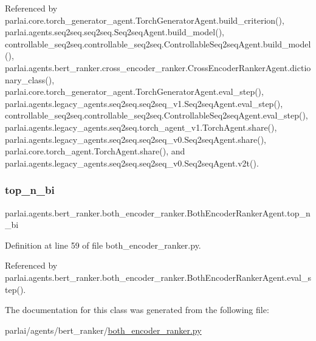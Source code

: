 Referenced by parlai.\+core.\+torch\+\_\+generator\+\_\+agent.\+Torch\+Generator\+Agent.\+build\+\_\+criterion(), parlai.\+agents.\+seq2seq.\+seq2seq.\+Seq2seq\+Agent.\+build\+\_\+model(), controllable\+\_\+seq2seq.\+controllable\+\_\+seq2seq.\+Controllable\+Seq2seq\+Agent.\+build\+\_\+model(), parlai.\+agents.\+bert\+\_\+ranker.\+cross\+\_\+encoder\+\_\+ranker.\+Cross\+Encoder\+Ranker\+Agent.\+dictionary\+\_\+class(), parlai.\+core.\+torch\+\_\+generator\+\_\+agent.\+Torch\+Generator\+Agent.\+eval\+\_\+step(), parlai.\+agents.\+legacy\+\_\+agents.\+seq2seq.\+seq2seq\+\_\+v1.\+Seq2seq\+Agent.\+eval\+\_\+step(), controllable\+\_\+seq2seq.\+controllable\+\_\+seq2seq.\+Controllable\+Seq2seq\+Agent.\+eval\+\_\+step(), parlai.\+agents.\+legacy\+\_\+agents.\+seq2seq.\+torch\+\_\+agent\+\_\+v1.\+Torch\+Agent.\+share(), parlai.\+agents.\+legacy\+\_\+agents.\+seq2seq.\+seq2seq\+\_\+v0.\+Seq2seq\+Agent.\+share(), parlai.\+core.\+torch\+\_\+agent.\+Torch\+Agent.\+share(), and parlai.\+agents.\+legacy\+\_\+agents.\+seq2seq.\+seq2seq\+\_\+v0.\+Seq2seq\+Agent.\+v2t().

\mbox{\label{classparlai_1_1agents_1_1bert__ranker_1_1both__encoder__ranker_1_1BothEncoderRankerAgent_ac4f692882d020eb3fced04859bd6f3ff}} 
\subsubsection{\texorpdfstring{top\+\_\+n\+\_\+bi}{top\_n\_bi}}
{\footnotesize\ttfamily parlai.\+agents.\+bert\+\_\+ranker.\+both\+\_\+encoder\+\_\+ranker.\+Both\+Encoder\+Ranker\+Agent.\+top\+\_\+n\+\_\+bi}



Definition at line 59 of file both\+\_\+encoder\+\_\+ranker.\+py.



Referenced by parlai.\+agents.\+bert\+\_\+ranker.\+both\+\_\+encoder\+\_\+ranker.\+Both\+Encoder\+Ranker\+Agent.\+eval\+\_\+step().



The documentation for this class was generated from the following file\+:\begin{DoxyCompactItemize}
\item 
parlai/agents/bert\+\_\+ranker/\hyperlink{both__encoder__ranker_8py}{both\+\_\+encoder\+\_\+ranker.\+py}\end{DoxyCompactItemize}
